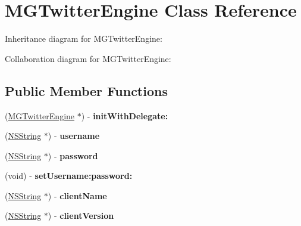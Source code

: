 \hypertarget{interface_m_g_twitter_engine}{
\section{\-M\-G\-Twitter\-Engine \-Class \-Reference}
\label{interface_m_g_twitter_engine}
}


\-Inheritance diagram for \-M\-G\-Twitter\-Engine\-:


\-Collaboration diagram for \-M\-G\-Twitter\-Engine\-:
\subsection*{\-Public \-Member \-Functions}
\begin{DoxyCompactItemize}
\item 
\hypertarget{interface_m_g_twitter_engine_a6da0fb696fb7aba0754af0fb417bf51d}{
(\hyperlink{interface_m_g_twitter_engine}{\-M\-G\-Twitter\-Engine} $\ast$) -\/ {\bfseries init\-With\-Delegate\-:}}
\label{interface_m_g_twitter_engine_a6da0fb696fb7aba0754af0fb417bf51d}

\item 
\hypertarget{interface_m_g_twitter_engine_aa684e5efb691e749d2e63574354d280c}{
(\hyperlink{class_n_s_string}{\-N\-S\-String} $\ast$) -\/ {\bfseries username}}
\label{interface_m_g_twitter_engine_aa684e5efb691e749d2e63574354d280c}

\item 
\hypertarget{interface_m_g_twitter_engine_af22ef32ca1527aec72f0b2d0a9314bb7}{
(\hyperlink{class_n_s_string}{\-N\-S\-String} $\ast$) -\/ {\bfseries password}}
\label{interface_m_g_twitter_engine_af22ef32ca1527aec72f0b2d0a9314bb7}

\item 
\hypertarget{interface_m_g_twitter_engine_a59118f1eaf7e14fcb966ad367e611cde}{
(void) -\/ {\bfseries set\-Username\-:password\-:}}
\label{interface_m_g_twitter_engine_a59118f1eaf7e14fcb966ad367e611cde}

\item 
\hypertarget{interface_m_g_twitter_engine_a1f6698b69f41b932f473200450902fcd}{
(\hyperlink{class_n_s_string}{\-N\-S\-String} $\ast$) -\/ {\bfseries client\-Name}}
\label{interface_m_g_twitter_engine_a1f6698b69f41b932f473200450902fcd}

\item 
\hypertarget{interface_m_g_twitter_engine_a8b6c8562796af5d489ff1282335f4636}{
(\hyperlink{class_n_s_string}{\-N\-S\-String} $\ast$) -\/ {\bfseries client\-Version}}
\label{interface_m_g_twitter_engine_a8b6c8562796af5d489ff1282335f4636}


\end{DoxyCompactItemize}
